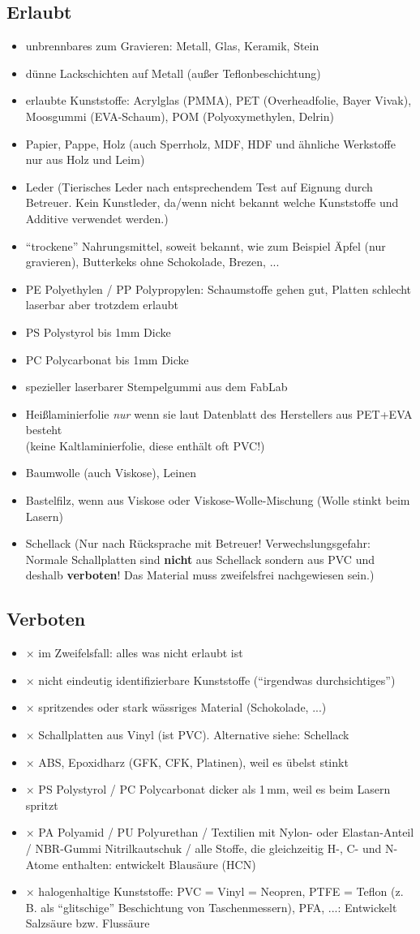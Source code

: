 \documentclass{\basedir/fablab-document}
\begin{document}
	\subsection{Erlaubt}
	\newcommand{\itemCheck}{\item[\checkmark]}
	\begin{itemize}
		\itemCheck unbrennbares zum Gravieren: Metall, Glas, Keramik, Stein
		\itemCheck dünne Lackschichten auf Metall (außer Teflonbeschichtung)
		\itemCheck erlaubte Kunststoffe: Acrylglas (PMMA), PET (Overheadfolie, Bayer Vivak), Moosgummi (EVA-Schaum), POM (Polyoxymethylen, Delrin)
		\itemCheck Papier, Pappe, Holz (auch Sperrholz, MDF, HDF und ähnliche Werkstoffe nur aus Holz und Leim)
		\itemCheck Leder (Tierisches Leder nach entsprechendem Test auf Eignung durch Betreuer. Kein Kunstleder, da/wenn nicht bekannt welche Kunststoffe und Additive verwendet werden.)
		\itemCheck \enquote{trockene} Nahrungsmittel, soweit bekannt, wie zum Beispiel Äpfel (nur gravieren), Butterkeks ohne Schokolade, Brezen, ...
		\itemCheck PE Polyethylen / PP Polypropylen: Schaumstoffe gehen gut, Platten schlecht laserbar aber trotzdem erlaubt
		\itemCheck PS Polystyrol bis 1mm Dicke
		\itemCheck PC Polycarbonat bis 1mm Dicke
		\itemCheck spezieller laserbarer Stempelgummi aus dem FabLab
		\itemCheck Heißlaminierfolie \emph{nur} wenn sie laut Datenblatt des Herstellers aus PET+EVA besteht\\(keine Kaltlaminierfolie, diese enthält oft PVC!)
		\itemCheck Baumwolle (auch Viskose), Leinen
		\itemCheck Bastelfilz, wenn aus Viskose oder Viskose-Wolle-Mischung (Wolle stinkt beim Lasern)
		\itemCheck Schellack (Nur nach Rücksprache mit Betreuer! Verwechslungsgefahr: Normale Schallplatten sind \textbf{nicht} aus Schellack sondern aus PVC und deshalb \textbf{verboten}! Das Material muss zweifelsfrei nachgewiesen sein.)
	\end{itemize}

	\newpage %

	\subsection{Verboten}
	\newcommand{\itemCross}{\item[$\times$]}
	\begin{itemize}
		\itemCross im Zweifelsfall: alles was nicht erlaubt ist
		\itemCross nicht eindeutig identifizierbare Kunststoffe (\enquote{irgendwas durchsichtiges})
		\itemCross spritzendes oder stark wässriges Material (Schokolade, ...)
		\itemCross Schallplatten aus Vinyl (ist PVC). Alternative siehe: Schellack
		\itemCross ABS, Epoxidharz (GFK, CFK, Platinen), weil es übelst stinkt
		\itemCross PS Polystyrol / PC Polycarbonat dicker als 1\,mm, weil es beim Lasern spritzt
		\itemCross PA Polyamid / PU Polyurethan / Textilien mit Nylon- oder Elastan-Anteil / NBR-Gummi Nitrilkautschuk / alle Stoffe, die gleichzeitig H-, C- und N-Atome enthalten: entwickelt Blausäure (HCN)
		\itemCross halogenhaltige Kunststoffe: PVC = Vinyl = Neopren, PTFE = Teflon (z.\,B. als \enquote{glitschige} Beschichtung von Taschenmessern), PFA, ...: Entwickelt Salzsäure bzw. Flussäure
	\end{itemize}
\end{document}
